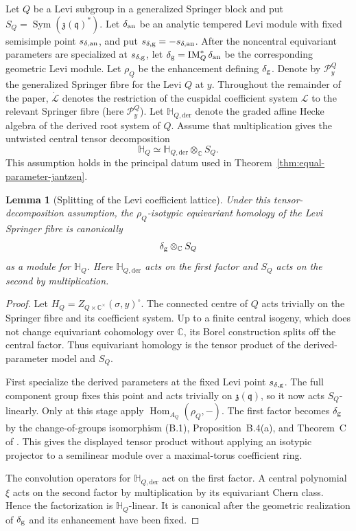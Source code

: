 \documentclass[11pt]{amsart}
\newtheorem{lemma}[theorem]{Lemma}
\theoremstyle{definition}
\theoremstyle{remark}
\newcommand{\Hh}{\mathbb H}
\begin{document}
Let $Q$ be a Levi subgroup in a generalized Springer block and put
$S_Q=\operatorname{Sym}(\mathfrak z(\mathfrak q)^*)$.  Let $\delta_{\rm an}$
be an analytic tempered Levi module with fixed semisimple point
$s_{\delta,{\rm an}}$, and put
$s_{\delta,{\rm g}}=-s_{\delta,{\rm an}}$.  After the noncentral equivariant
parameters are specialized at $s_{\delta,{\rm g}}$, let
$\delta_{\rm g}=\operatorname{IM}_Q^*\delta_{\rm an}$ be the corresponding
geometric Levi module.  Let $\rho_Q$ be the enhancement defining
$\delta_{\rm g}$.  Denote by $\mathcal P_y^Q$ the generalized Springer fibre
for the Levi $Q$ at $y$.  Throughout the remainder of the paper,
$\dot{\mathcal L}$ denotes the restriction of the cuspidal coefficient
system $\mathcal L$ to the relevant Springer fibre (here $\mathcal P_y^Q$).
Let $\Hh_{Q,\mathrm{der}}$ denote the graded affine Hecke algebra of the
derived root system of $Q$.  Assume that multiplication gives the untwisted
central tensor decomposition
\[
 \Hh_Q\simeq \Hh_{Q,\mathrm{der}}\otimes_{\mathbb C}S_Q.
\]
This assumption holds in
the principal datum used in Theorem~\ref{thm:equal-parameter-jantzen}.

\begin{lemma}[Splitting of the Levi coefficient lattice]
\label{lem:levi-coefficient-splitting}
Under this tensor-decomposition assumption, the
$\rho_Q$-isotypic equivariant homology of the Levi Springer fibre is
canonically
\[
 \delta_{\rm g}\otimes_{\mathbb C}S_Q
\]
as a module for $\Hh_Q$.
Here $\Hh_{Q,\mathrm{der}}$ acts on the first factor and $S_Q$ acts on the
second by multiplication.
\end{lemma}

\begin{proof}
Let $H_Q=Z_{Q\times\mathbb C^\times}(\sigma,y)^\circ$.
The connected centre of $Q$ acts trivially on the Springer fibre and its
coefficient system.  Up to a finite central isogeny, which does not
change equivariant cohomology over $\mathbb C$, its Borel construction
splits off the central factor.  Thus equivariant homology is the tensor
product of the derived-parameter model and $S_Q$.

First specialize the derived parameters at the fixed Levi point
$s_{\delta,{\rm g}}$.  The full component group fixes this point and
acts trivially on $\mathfrak z(\mathfrak q)$, so it now acts
$S_Q$-linearly.  Only at this stage apply
$\operatorname{Hom}_{A_Q}(\rho_Q,-)$.
The first factor becomes $\delta_{\rm g}$ by the change-of-groups
isomorphism (B.1), Proposition~B.4(a), and Theorem~C of
\cite{Solleveld}.  This gives the displayed tensor product without
applying an isotypic projector to a semilinear module over a
maximal-torus coefficient ring.

The convolution operators for $\Hh_{Q,\mathrm{der}}$ act on the first
factor.  A central polynomial $\xi$ acts on the second factor by
multiplication by its equivariant Chern class.  Hence the factorization
is $\Hh_Q$-linear.  It is canonical after the geometric realization of
$\delta_{\rm g}$ and its enhancement have been fixed.
\end{proof}
\end{document}
